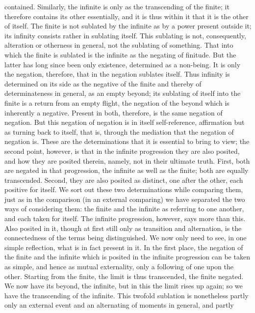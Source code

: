 contained. Similarly, the infinite is only as the transcending of the finite;
it therefore contains its other essentially, and it is thus within it that it is
the other of itself. The finite is not sublated by the infinite as by a power
present outside it; its infinity consists rather in sublating itself.
This sublating is not, consequently, alteration or otherness in general,
not the sublating of something. That into which the finite is sublated is
the infinite as the negating of finitude. But the latter has long since been
only existence, determined as a non-being. It is only the negation, therefore,
that in the negation sublates itself. Thus infinity is determined on its side
as the negative of the finite and thereby of determinateness in general, as
an empty beyond; its sublating of itself into the finite is a return from an
empty flight, the negation of the beyond which is inherently a negative.
Present in both, therefore, is the same negation of negation. But this
negation of negation is in itself self-reference, affirmation but as turning
back to itself, that is, through the mediation that the negation of negation is.
These are the determinations that it is essential to bring to view; the second
point, however, is that in the infinite progression they are also posited, and
how they are posited therein, namely, not in their ultimate truth.
First, both are negated in that progression, the infinite as well as the finite;
both are equally transcended. Second, they are also posited as distinct, one
after the other, each positive for itself. We sort out these two determinations
while comparing them, just as in the comparison (in an external comparing)
we have separated the two ways of considering them: the finite and the
infinite as referring to one another, and each taken for itself. The infinite
progression, however, says more than this. Also posited in it, though at
first still only as transition and alternation, is the connectedness of the terms
being distinguished. We now only need to see, in one simple reflection,
what is in fact present in it.
In the first place, the negation of the finite and the infinite which is
posited in the infinite progression can be taken as simple, and hence as
mutual externality, only a following of one upon the other. Starting from
the finite, the limit is thus transcended, the finite negated. We now have
its beyond, the infinite, but in this the limit rises up again; so we have the
transcending of the infinite. This twofold sublation is nonetheless partly
only an external event and an alternating of moments in general, and partly
